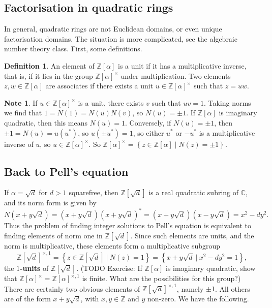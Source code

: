 \documentclass{article}
\newcommand{\Z}{\mathbb{Z}}
\newcommand{\C}{\mathbb{C}}
\newcommand{\rb}[1]{\left( #1 \right)}
\renewcommand{\sb}[1]{\left[ #1 \right]}
\newcommand{\cb}[1]{\left\{ #1 \right\}}
\theoremstyle{definition}\newtheorem{definition}{Definition}
\theoremstyle{definition}\newtheorem{remark}[definition]{Remark}
\theoremstyle{definition}\newtheorem*{example}{Example}
\theoremstyle{definition}\newtheorem*{note}{Note}
\begin{document}
\subsection{Factorisation in quadratic rings}

In general, quadratic rings are not Euclidean domains, or even unique factorisation domains. The situation is more complicated, see the algebraic number theory class. First, some definitions.

\begin{definition}
An element of $ \Z\sb{\alpha} $ is a unit if it has a multiplicative inverse, that is, if it lies in the group $ \Z\sb{\alpha}^\times $ under multiplication. Two elements $ z, w \in \Z\sb{\alpha} $ are associates if there exists a unit $ u \in \Z\sb{\alpha}^\times $ such that $ z = uw $.
\end{definition}

\begin{note}
If $ u \in \Z\sb{\alpha}^\times $ is a unit, there exists $ v $ such that $ uv = 1 $. Taking norms we find that $ 1 = N\rb{1} = N\rb{u}N\rb{v} $, so $ N\rb{u} = \pm 1 $. If $ \Z\sb{\alpha} $ is imaginary quadratic, then this means $ N\rb{u} = 1 $. Conversely, if $ N\rb{u} = \pm 1 $, then $ \pm 1 = N\rb{u} = u\rb{u^*} $, so $ u\rb{\pm u^*} = 1 $, so either $ u^* $ or $ -u^* $ is a multiplicative inverse of $ u $, so $ u \in \Z\sb{\alpha}^\times $. So $ \Z\sb{\alpha}^\times = \cb{z \in \Z\sb{\alpha} \mid N\rb{z} = \pm 1} $.
\end{note}

\subsection{Back to Pell's equation}

If $ \alpha = \sqrt{d} $ for $ d > 1 $ squarefree, then $ \Z\sb{\sqrt{d}} $ is a real quadratic subring of $ \C $, and its norm form is given by
$$ N\rb{x + y\sqrt{d}} = \rb{x + y\sqrt{d}}\rb{x + y\sqrt{d}}^* = \rb{x + y\sqrt{d}}\rb{x - y\sqrt{d}} = x^2 - dy^2. $$
Thus the problem of finding integer solutions to Pell's equation is equivalent to finding elements of norm one in $ \Z\sb{\sqrt{d}} $. Since such elements are units, and the norm is multiplicative, these elements form a multiplicative subgroup
$$ \Z\sb{\sqrt{d}}^{\times, 1} = \cb{z \in \Z\sb{\sqrt{d}} \ \Big| \ N\rb{z} = 1} = \cb{x + y\sqrt{d} \ \Big| \ x^2 - dy^2 = 1}, $$
the \textbf{$ 1 $-units} of $ \Z\sb{\sqrt{d}} $. (TODO Exercise: If $ \Z\sb{\alpha} $ is imaginary quadratic, show that $ \Z\sb{\alpha}^\times = \Z\sb{\alpha}^{\times, 1} $ is finite. What are the possibilities for this group?) There are certainly two obvious elements of $ \Z\sb{\sqrt{d}}^{\times, 1} $, namely $ \pm 1 $. All others are of the form $ x + y\sqrt{d} $, with $ x, y \in \Z $ and $ y $ non-zero. We have the following.
\end{document}
